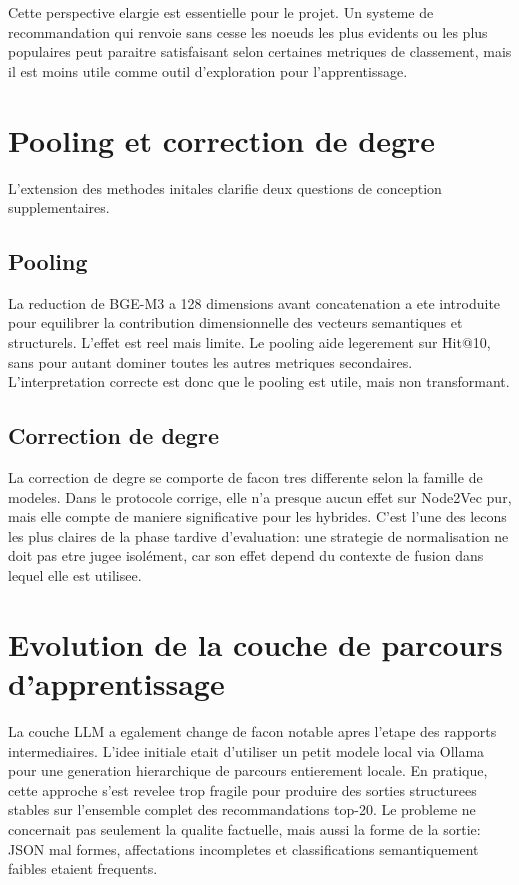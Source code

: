 Cette perspective elargie est essentielle pour le projet. Un systeme de
recommandation qui renvoie sans cesse les noeuds les plus evidents ou les plus
populaires peut paraitre satisfaisant selon certaines metriques de classement,
mais il est moins utile comme outil d'exploration pour l'apprentissage.

\section{Pooling et correction de degre}

L'extension des methodes initales clarifie deux questions de conception supplementaires.

\subsection{Pooling}

La reduction de BGE-M3 a 128 dimensions avant concatenation a ete introduite
pour equilibrer la contribution dimensionnelle des vecteurs semantiques et
structurels. L'effet est reel mais limite. Le pooling aide legerement sur
Hit@10, sans pour autant dominer toutes les autres metriques secondaires.
L'interpretation correcte est donc que le pooling est utile, mais non
transformant.

\subsection{Correction de degre}

La correction de degre se comporte de facon tres differente selon la famille de
modeles. Dans le protocole corrige, elle n'a presque aucun effet sur Node2Vec
pur, mais elle compte de maniere significative pour les hybrides. C'est l'une
des lecons les plus claires de la phase tardive d'evaluation: une strategie de
normalisation ne doit pas etre jugee isolément, car son effet depend du contexte
de fusion dans lequel elle est utilisee.

\section{Evolution de la couche de parcours d'apprentissage}

La couche LLM a egalement change de facon notable apres l'etape des rapports
intermediaires. L'idee initiale etait d'utiliser un petit modele local via
Ollama pour une generation hierarchique de parcours entierement locale. En
pratique, cette approche s'est revelee trop fragile pour produire des sorties
structurees stables sur l'ensemble complet des recommandations top-20. Le
probleme ne concernait pas seulement la qualite factuelle, mais aussi la forme
de la sortie: JSON mal formes, affectations incompletes et classifications
semantiquement faibles etaient frequents.

